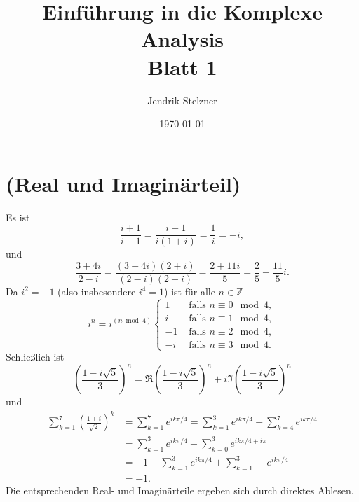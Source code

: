 \documentclass[a4paper,10pt]{article}
\title{\sc Einführung in die Komplexe Analysis \\ \Large Blatt 1}
\author{Jendrik Stelzner}
\date{\today}
\theoremstyle{definition}
\newcommand{\Z}{\mathbb{Z}}
\begin{document}
\maketitle





\section{(Real und Imaginärteil)}
Es ist
\[
 \frac{i+1}{i-1} = \frac{i+1}{i(1+i)} = \frac{1}{i} = -i,
\]
und
\[
 \frac{3+4i}{2-i} = \frac{(3+4i)(2+i)}{(2-i)(2+i)} = \frac{2+11i}{5} = \frac{2}{5} + \frac{11}{5}i.
\]
Da $i^2 = -1$ (also insbesondere $i^4 = 1$) ist für alle $n \in \Z$
\[
 i^n =
 i^{(n \bmod 4)}
 \begin{cases}
   1 & \text{ falls } n \equiv 0 \mod 4, \\
   i & \text{ falls } n \equiv 1 \mod 4, \\
  -1 & \text{ falls } n \equiv 2 \mod 4, \\
  -i & \text{ falls } n \equiv 3 \mod 4.
 \end{cases}
\]
Schließlich ist
\[
 \left(\frac{1-i\sqrt{5}}{3}\right)^n
 = \Re \left(\frac{1-i\sqrt{5}}{3}\right)^n + i \Im \left(\frac{1-i\sqrt{5}}{3}\right)^n
\]
und
\begin{align*}
 \sum_{k=1}^7 \left(\frac{1+i}{\sqrt{2}}\right)^k
 &= \sum_{k=1}^7 e^{ik\pi/4}
 = \sum_{k=1}^3 e^{ik\pi/4} + \sum_{k=4}^7 e^{ik\pi/4} \\
 &= \sum_{k=1}^3 e^{ik\pi/4} + \sum_{k=0}^3 e^{ik\pi/4+i\pi} \\
 &= -1 + \sum_{k=1}^3 e^{ik\pi/4} + \sum_{k=1}^3 -e^{ik\pi/4} \\
 &= -1.
\end{align*}
Die entsprechenden Real- und Imaginärteile ergeben sich durch direktes Ablesen.
\end{document}
